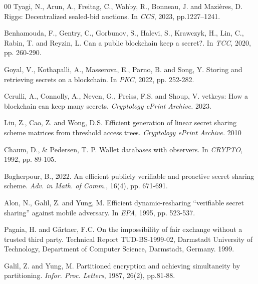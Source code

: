 \documentclass[runningheads]{llncs}
\begin{document}
\begin{thebibliography}{00}
 Tyagi, N., Arun, A., Freitag, C., Wahby, R., Bonneau, J. and Mazières, D. Riggs: Decentralized sealed-bid auctions. In \emph{CCS}, 2023, pp.1227–1241.


Benhamouda, F., Gentry, C., Gorbunov, S., Halevi, S., Krawczyk, H., Lin, C., Rabin, T. and Reyzin, L. Can a public blockchain keep a secret?. In \textit{TCC}, 2020, pp. 260-290.

Goyal, V., Kothapalli, A., Masserova, E., Parno, B. and Song, Y. Storing and retrieving secrets on a blockchain. In \textit{PKC}, 2022, pp. 252-282.

Cerulli, A., Connolly, A., Neven, G., Preiss, F.S. and Shoup, V. vetkeys: How a blockchain can keep many secrets. \textit{Cryptology ePrint Archive.} 2023.

Liu, Z., Cao, Z. and Wong, D.S. Efficient generation of linear secret sharing scheme matrices from threshold access trees. \textit{Cryptology ePrint Archive.} 2010


 Chaum, D., \& Pedersen, T. P. Wallet databases with observers. In \textit{CRYPTO}, 1992, pp. 89-105.

Bagherpour, B., 2022. An efficient publicly verifiable and proactive secret sharing scheme. \textit{Adv. in Math. of Comm.}, 16(4), pp. 671-691.

Alon, N., Galil, Z. and Yung, M. Efficient dynamic-resharing “verifiable secret sharing” against mobile adversary. In \textit{EPA}, 1995, pp. 523-537.


Pagnia, H. and Gärtner, F.C. On the impossibility of fair exchange without a trusted third party. Technical Report TUD-BS-1999-02, Darmstadt University of Technology, Department of Computer Science, Darmstadt, Germany. 1999.

Galil, Z. and Yung, M. Partitioned encryption and achieving simultaneity by partitioning. \textit{Infor. Proc. Letters}, 1987, 26(2), pp.81-88.


\end{thebibliography}
\end{document}
